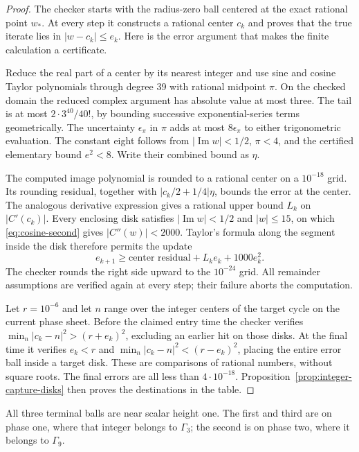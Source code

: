 \begin{proof}
The checker  starts with
the radius-zero ball centered at the exact rational point $w_*$.
At every step it constructs a rational center $c_k$ and proves that
the true iterate lies in $|w-c_k|\le e_k$. Here is the error argument
that makes the finite calculation a certificate.

Reduce the real part of a center by its nearest integer and use
sine and cosine Taylor polynomials through degree 39 with rational
midpoint $\widehat\pi$. On the checked domain the reduced complex
argument has absolute value at most three. The tail is at most
$2\cdot3^{40}/40!$, by bounding successive exponential-series
terms geometrically. The uncertainty $\epsilon_\pi$ in $\pi$ adds
at most $8\epsilon_\pi$ to either trigonometric evaluation. The
constant eight follows from $|\operatorname{Im}w|<1/2$,
$\pi<4$, and the certified elementary bound $e^2<8$.
Write their combined bound as $\eta$.

The computed image polynomial is rounded to a rational center on a
$10^{-18}$ grid. Its rounding residual, together with
$|c_k/2+1/4|\eta$, bounds the error at the center. The analogous
derivative expression gives a rational upper bound $L_k$ on
$|C'(c_k)|$. Every enclosing disk satisfies
$|\operatorname{Im}w|<1/2$ and $|w|\le15$, on which
\eqref{eq:cosine-second} gives $|C''(w)|<2000$. Taylor's formula
along the segment inside the disk therefore permits the update
\begin{equation}\label{eq:complex-ball-error}
 e_{k+1}\ge \text{center residual}+L_ke_k+1000e_k^2.
\end{equation}
The checker rounds the right side upward to the $10^{-24}$ grid.
All remainder assumptions are verified again at every step; their
failure aborts the computation.

Let $r=10^{-6}$ and let $n$ range over the integer centers of the
target cycle on the current phase sheet. Before the claimed entry
time the checker verifies
$\min_n|c_k-n|^2>(r+e_k)^2$, excluding an earlier hit on those
disks. At the final time it verifies $e_k<r$ and
$\min_n|c_k-n|^2<(r-e_k)^2$, placing the entire error ball inside
a target disk. These are comparisons of rational numbers, without
square roots. The final errors are all less than $4\cdot10^{-18}$.
Proposition~\ref{prop:integer-capture-disks} then proves the
destinations in the table.
\end{proof}

All three terminal balls are near scalar height one. The first and
third are on phase one, where that integer belongs to $\Gamma_3$;
the second is on phase two, where it belongs to $\Gamma_9$.

